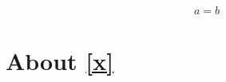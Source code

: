 \documentclass{article}
\begin{document}
\begin{equation} a=b \label{x} \end{equation}
\section{About \eqref{x}}
\end{document}

